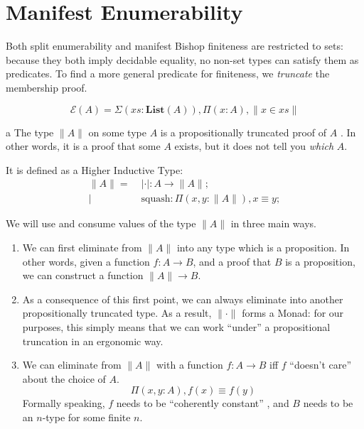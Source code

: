 \section{Manifest Enumerability} \label{manifest-enumerability}
Both split enumerability and manifest Bishop finiteness are restricted to sets:
because they both imply decidable equality, no non-set types can satisfy them as
predicates.
To find a more general predicate for finiteness, we \emph{truncate} the
membership proof.
\begin{rm-definition}
  \begin{equation}
    \mathcal{E}(A) = \Sigma {(\mathit{xs} : \mathbf{List}(A))} , \Pi {(x : A)} , \lVert x \in \mathit{xs} \rVert
  \end{equation}
\end{rm-definition}
\begin{rm-definition}a \label{prop-trunc}
  The type \(\lVert A \rVert\) on some type \(A\) is a propositionally truncated
  proof of \(A\) \cite[3.7]{hottbook}.
  In other words, it is a proof that some \(A\) exists, but it does not tell you
  \emph{which} \(A\).

  It is defined as a Higher Inductive Type:
  \begin{equation}
    \begin{aligned}
      \lVert A \rVert =& \; \lvert \cdot \rvert : A \rightarrow \lVert A \rVert ; \\
                      |& \; \text{squash} : \Pi {(x, y : \lVert A \rVert)} , x \equiv y  ; 
    \end{aligned}
  \end{equation}

  We will use and consume values of the type \(\lVert A \rVert\) in three main
  ways.
  \begin{enumerate}
    \item \label{elim-prop-prop} We can first eliminate from \(\lVert A \rVert\)
      into any type which is a proposition.
      In other words, given a function \(f : A \rightarrow B\), and a proof that
      \(B\) is a proposition, we can construct a function \(\lVert A \rVert
      \rightarrow B\).
    \item \label{elim-prop-monad} As a consequence of this first point, we can
      always eliminate into another propositionally truncated type.
      As a result, \(\lVert \cdot \rVert\) forms a Monad: for our purposes, this
      simply means that we can work ``under'' a propositional truncation in an
      ergonomic way.
    \item \label{elim-prop-coh} We can eliminate from \(\lVert A \rVert\) with a
      function \(f : A \rightarrow B\) iff \(f\) ``doesn't care'' about the
      choice of \(A\).
      \begin{equation}
        \Pi {(x , y : A)} , f(x) \equiv f(y)
      \end{equation}
      Formally speaking, \(f\) needs to be ``coherently constant''
      \cite{krausGeneralUniversalProperty2015}, and \(B\) needs to be an
      \(n\)-type for some finite \(n\).
  \end{enumerate}
\end{rm-definition}


